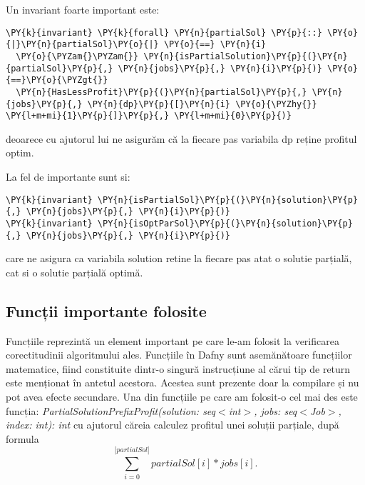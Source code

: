 Un invariant foarte important este:
\begin{Verbatim}[commandchars=\\\{\}, fontsize=\small]
\PY{k}{invariant} \PY{k}{forall} \PY{n}{partialSol} \PY{p}{::} \PY{o}{|}\PY{n}{partialSol}\PY{o}{|} \PY{o}{==} \PY{n}{i}
  \PY{o}{\PYZam{}\PYZam{}} \PY{n}{isPartialSolution}\PY{p}{(}\PY{n}{partialSol}\PY{p}{,} \PY{n}{jobs}\PY{p}{,} \PY{n}{i}\PY{p}{)} \PY{o}{==}\PY{o}{\PYZgt{}} 
  \PY{n}{HasLessProfit}\PY{p}{(}\PY{n}{partialSol}\PY{p}{,} \PY{n}{jobs}\PY{p}{,} \PY{n}{dp}\PY{p}{[}\PY{n}{i} \PY{o}{\PYZhy{}} \PY{l+m+mi}{1}\PY{p}{]}\PY{p}{,} \PY{l+m+mi}{0}\PY{p}{)}
\end{Verbatim}
deoarece cu ajutorul lui ne asigurăm că la fiecare pas variabila dp reține profitul optim. 

La fel de importante sunt si:
\begin{Verbatim}[commandchars=\\\{\}, fontsize=\small]
\PY{k}{invariant} \PY{n}{isPartialSol}\PY{p}{(}\PY{n}{solution}\PY{p}{,} \PY{n}{jobs}\PY{p}{,} \PY{n}{i}\PY{p}{)}
\PY{k}{invariant} \PY{n}{isOptParSol}\PY{p}{(}\PY{n}{solution}\PY{p}{,} \PY{n}{jobs}\PY{p}{,} \PY{n}{i}\PY{p}{)}
\end{Verbatim}

care ne asigura ca variabila solution retine la fiecare pas atat o solutie parțială, cat si o solutie parțială optimă. 

\subsection{Funcții importante folosite}
Funcțiile reprezintă un element important pe care le-am folosit la verificarea corectitudinii algoritmului ales. 
Funcțiile în Dafny sunt asemănătoare funcțiilor matematice, fiind constituite dintr-o singură instrucțiune al cărui tip de return este menționat în antetul acestora. Acestea sunt prezente doar
la compilare și nu pot avea efecte secundare.\cite{DBLP:journals/jlap/BlazquezMS23}
Una din funcțiile pe care am folosit-o cel mai des este funcția: \textit{PartialSolutionPrefixProfit(solution: seq$<$int$>$, jobs: seq$<$Job$>$, index: int): int} cu ajutorul căreia calculez profitul unei soluții parțiale, după formula \[ \sum_{i=0}^{|partialSol|} partialSol[i] * jobs[i]. \]

